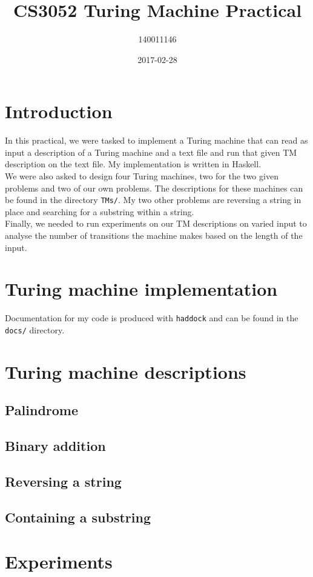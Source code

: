 \documentclass{article}
\title{CS3052 Turing Machine Practical}
\date{2017-02-28}
\author{140011146}
\newcommand{\n}[0]{\\[\baselineskip]}
\begin{document}
\maketitle

\newpage
{}


\section{Introduction}
In this practical, we were tasked to implement a Turing machine that can read as input a description of a Turing machine and a text file and run that given TM description on the text file. My implementation is written in Haskell.
\n
We were also asked to design four Turing machines, two for the two given problems and two of our own problems. The descriptions for these machines can be found in the directory \texttt{TMs/}. My two other problems are reversing a string in place and searching for a substring within a string.
\n
Finally, we needed to run experiments on our TM descriptions on varied input to analyse the number of transitions the machine makes based on the length of the input.
\section{Turing machine implementation}

Documentation for my code is produced with \texttt{haddock} and can be found in the \texttt{docs/} directory.
\section{Turing machine descriptions}

\subsection{Palindrome}

\subsection{Binary addition}

\subsection{Reversing a string}

\subsection{Containing a substring}

\section{Experiments}
\end{document}

